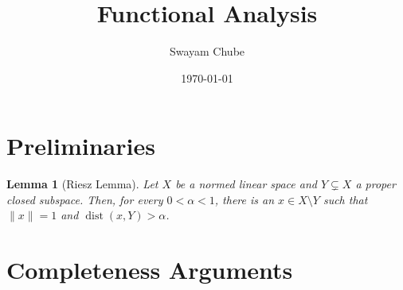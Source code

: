 \documentclass[12pt]{article}
\title{Functional Analysis}
\author{Swayam Chube}
\date{\today}
\theoremstyle{thmstyle}
\newtheorem{lemma}[theorem]{Lemma}
\theoremstyle{defstyle}
\begin{document}
\maketitle

\section{Preliminaries}

\begin{lemma}[Riesz Lemma]
    Let $X$ be a normed linear space and $Y\subsetneq X$ a proper closed subspace. Then, for every $0 < \alpha < 1$, there is an $x\in X\setminus Y$ such that $\|x\| = 1$ and $\operatorname{dist}(x, Y) > \alpha$.
\end{lemma}

\section{Completeness Arguments}
\end{document}
